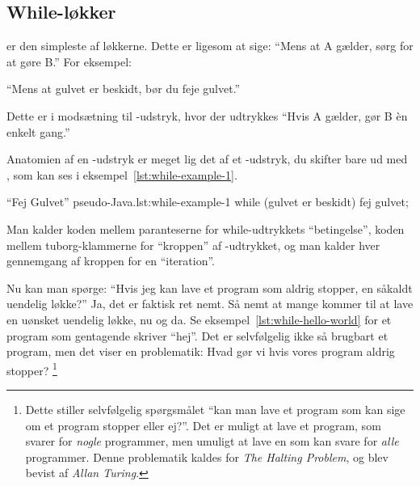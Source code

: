 
	\subsection{While-løkker}

		 er den simpleste af løkkerne. Dette er ligesom at
		sige: ``Mens at A gælder, sørg for at gøre B.'' For eksempel:

		``Mens at gulvet er beskidt, bør du feje gulvet.''

		Dette er i modsætning til -udstryk, hvor der udtrykkes
		``Hvis A gælder, gør B èn enkelt gang.''



		Anatomien af en -udstryk er meget lig det af et
		-udstryk, du skifter bare  ud med
		, som kan ses i eksempel~\ref{lst:while-example-1}.

		\begin{JavaCode}{``Fej Gulvet'' pseudo-Java.}{lst:while-example-1}
			while (gulvet er beskidt) {
				fej gulvet;
			}
		\end{JavaCode}

		Man kalder koden mellem paranteserne for while-udtrykkets ``betingelse'',
		koden mellem tuborg-klammerne for ``kroppen'' af
		-udtrykket, og man kalder hver gennemgang af kroppen
		for en ``iteration''.

		Nu kan man spørge: ``Hvis jeg kan lave et program som aldrig stopper, en
		såkaldt uendelig løkke?'' Ja, det er faktisk ret nemt. Så nemt at mange
		kommer til at lave en uønsket uendelig løkke, nu og da. Se
		eksempel~\ref{lst:while-hello-world}
		for et program som gentagende skriver ``hej''. Det er selvfølgelig ikke
		så brugbart et program, men det viser en problematik: Hvad gør vi hvis
		vores program aldrig stopper?  \footnote{Dette stiller selvfølgelig spørgsmålet ``kan man lave et program som kan sige om et program stopper eller ej?''. Det er muligt at lave et program, som svarer for \emph{nogle} programmer, men umuligt at lave en som kan svare for \emph{alle} programmer. Denne problematik kaldes for \emph{The Halting Problem}, og blev bevist af \emph{Allan Turing}.}

